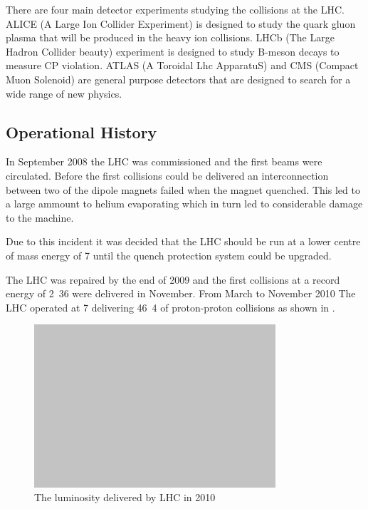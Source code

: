 There are four main detector experiments studying the collisions at the LHC. 
ALICE (A Large Ion Collider Experiment) is designed to study the quark gluon
plasma that will be produced in the heavy ion collisions. 
LHCb (The Large Hadron Collider beauty) experiment is designed to study B-meson
decays to measure CP violation. 
ATLAS (A Toroidal Lhc ApparatuS) and CMS (Compact Muon Solenoid) are general
purpose detectors that are designed 
to search for a wide range of new physics.\cite{lhc}

\subsection{Operational History}
In September 2008 the LHC was commissioned and the first beams were circulated.
Before the first collisions could be delivered an interconnection
between two of the dipole magnets failed when the magnet quenched.
This led to a large ammount to helium evaporating which in turn led to
considerable damage to the machine.

Due to this incident it was decided that the LHC should be run at a lower centre
of mass energy of \unit{7}{\TeV} until the quench protection system could be
upgraded.

The LHC was repaired by the end of 2009 and the first collisions at a record
energy of \unit{2.36}{\TeV} were delivered in November. 
From March to November 2010 The LHC operated at \unit{7}{\TeV} delivering
\unit{46.4}{\invpb} of proton-proton collisions as shown in
.

\begin{figure}[htb!]
  \centering
  \includegraphics[width=0.8\textwidth]{placeholder}
  \caption{The luminosity delivered by LHC in 2010}
  \label{fig:LHC2010}
\end{figure}

